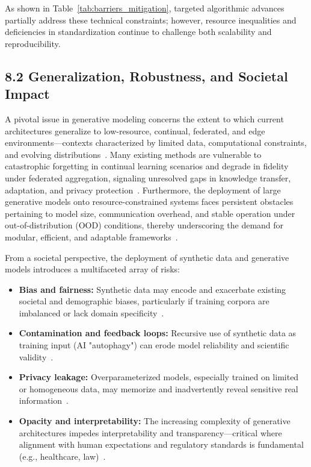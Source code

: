 \documentclass[11pt]{article}
\begin{document}
As shown in Table~\ref{tab:barriers_mitigation}, targeted algorithmic advances partially address these technical constraints; however, resource inequalities and deficiencies in standardization continue to challenge both scalability and reproducibility.

\subsection{8.2 Generalization, Robustness, and Societal Impact}

A pivotal issue in generative modeling concerns the extent to which current architectures generalize to low-resource, continual, federated, and edge environments—contexts characterized by limited data, computational constraints, and evolving distributions~\cite{72,73}. Many existing methods are vulnerable to catastrophic forgetting in continual learning scenarios and degrade in fidelity under federated aggregation, signaling unresolved gaps in knowledge transfer, adaptation, and privacy protection~\cite{73}. Furthermore, the deployment of large generative models onto resource-constrained systems faces persistent obstacles pertaining to model size, communication overhead, and stable operation under out-of-distribution (OOD) conditions, thereby underscoring the demand for modular, efficient, and adaptable frameworks~\cite{73,74,88}.

From a societal perspective, the deployment of synthetic data and generative models introduces a multifaceted array of risks:
\begin{itemize}
    \item \textbf{Bias and fairness:} Synthetic data may encode and exacerbate existing societal and demographic biases, particularly if training corpora are imbalanced or lack domain specificity~\cite{21,24,58,63,81}.
    \item \textbf{Contamination and feedback loops:} Recursive use of synthetic data as training input (AI "autophagy") can erode model reliability and scientific validity~\cite{77,78,84}.
    \item \textbf{Privacy leakage:} Overparameterized models, especially trained on limited or homogeneous data, may memorize and inadvertently reveal sensitive real information~\cite{81,82,88,90}.
    \item \textbf{Opacity and interpretability:} The increasing complexity of generative architectures impedes interpretability and transparency—critical where alignment with human expectations and regulatory standards is fundamental (e.g., healthcare, law)~\cite{10,32,60,68,69,78,81,82}.
\end{itemize}
\end{document}
